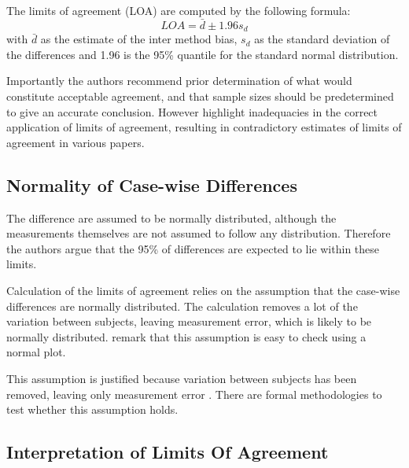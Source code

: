 \documentclass[12pt, a4paper]{report}
\theoremstyle{plain}
\theoremstyle{definition}
\theoremstyle{remark}
\begin{document}
The limits of agreement (LOA) are computed by the following
formula:
\[
LOA = \bar{d} \pm 1.96 s_{d}
\]
with $\bar{d}$ as the estimate of the inter method bias, $s_{d}$
as the standard deviation of the differences and 1.96 is the 95\%
quantile for the standard normal distribution. 

Importantly the authors recommend prior determination of what would constitute acceptable agreement, and that sample sizes should be predetermined to give an accurate conclusion. However \citet{mantha} highlight inadequacies in the correct application of limits of agreement, resulting in contradictory estimates of limits of agreement in various papers.








\subsection{Normality of Case-wise Differences}	
The difference are assumed to be normally distributed, although the measurements themselves are not assumed to follow any distribution. Therefore the authors argue that the 95\% of differences are expected to lie within these limits. 

Calculation of the limits of agreement relies on the assumption that the case-wise differences are normally distributed.
The calculation removes a lot of the variation between subjects,  leaving measurement error, which is likely to be normally distributed. \citet{BA99} remark that this assumption is easy to check using a normal plot. 


This assumption is justified because variation between subjects has been removed, leaving only measurement error \citep{BA86}. There are formal methodologies to test whether this assumption holds.






\subsection{Interpretation of Limits Of Agreement}
\end{document}
